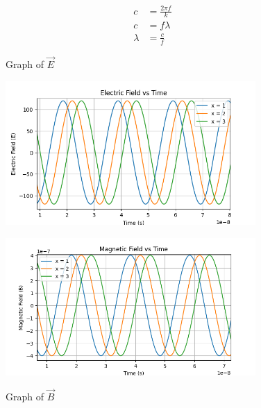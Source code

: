 \documentclass[journal,12pt,twocolumn]{IEEEtran}
\theoremstyle{remark}
\begin{document}
\newpage

\begin{align}
    c &= \frac{2\pi f}{k}\\
    c &= f\lambda\\
    \lambda &= \frac{c}{f}
\end{align}


\newpage

\renewcommand{\thefigure}{\theenumi}
\renewcommand{\thetable}{\theenumi}

\begin{flushleft}

\begin{figure}[ht]
\renewcommand\thefigure{1}
  \caption{Graph of $\vec{E}$}
  \includegraphics[width=0.85\textwidth]{figs/fig1.png}
  \label{fig:fig1.12.8.8}

    \renewcommand\thefigure{2}
    \caption{Graph of $\vec{B}$}
    \includegraphics[width=0.85\textwidth]{figs/fig2.png}
    \label{fig:fig2.12.8.8}
\end{figure}

\end{flushleft}
\end{document}
